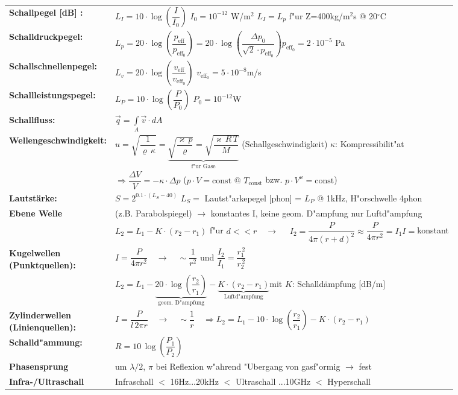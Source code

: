 \begin{tabular}{>{\bfseries}ll}
Schallpegel [dB] : & $\boxed{L_I=10\cdot \log\left(\dfrac{I}{I_0}\right)}$\qquad
$I_0=10^{-12}$ W/m$^2$ \qquad $L_I=L_p$ f"ur Z=400kg/m$^2$s @ 20$^{\circ}$C\\
Schalldruckpegel: & $L_p=20\cdot\log\left(\dfrac{p_{\text{eff}}}{p_{\text{eff}_0}}\right)= 20\cdot\log\left(\dfrac{\Delta p_0}{\sqrt{2}\cdot p_{\text{eff}_0}}\right)$\qquad $p_{\text{eff}_0}=2\cdot 10^{-5}$ Pa\\
Schallschnellenpegel: & $L_v=20\cdot\log\left(\dfrac{v_{\text{eff}}}{v_{\text{eff}_0}}\right)$ \qquad $v_{\text{eff}_0}=5\cdot10^{-8}$m/s \\
Schallleistungspegel: & 
$L_P = 10\cdot\log\left(\dfrac{P}{P_0}\right)$ \qquad  $P_0=10^{-12}$W\\
Schallfluss: & $\vec q=\int\limits_{A}{\vec v\cdot dA}$\\
Wellengeschwindigkeit: & $u=\sqrt{\dfrac{1}{\varrho\,\kappa}}=\underbrace{\sqrt{\dfrac{\varkappa\,p}{\varrho}}=\sqrt{\dfrac{\varkappa\,R\,T}{M}}}_{\text{f"ur Gase}}$ \qquad (Schallgeschwindigkeit) $\kappa$: Kompressibilit"at \quad\\
& $\Rightarrow\dfrac{\Delta V}{V}=-\kappa\cdot\Delta p$ \qquad ($p\cdot V=\text{const}\,\,@\,\,T_{\text{const}}$ bzw. $p\cdot V^{\varkappa}=\text{const}$) \\
Lautstärke: & $S=2^{0.1\cdot(L_S-40)}$ \qquad $L_S=$ Lautst"arkepegel [phon] = $L_P$ @ 1kHz, H"orschwelle 4phon\\
Ebene Welle & (z.B. Parabolspiegel) $\rightarrow$ konstantes I, keine geom. D"ampfung nur Luftd"ampfung\\
& $\boxed{L_2=L_1-K\cdot(r_2-r_1)}$ f"ur $d<<r\quad\rightarrow\quad$ $I_2=\dfrac{P}{4\pi(r+d)^2}\approx\dfrac{P}{4\pi r^2}=I_1$\quad$I=$konstant\\
\parbox{3cm}{Kugelwellen\\
(Punktquellen)}: &  $I=\dfrac{P}{4\pi r^2}\quad\rightarrow\quad \sim\dfrac{1}{r^2}$ und $\dfrac{I_2}{I_1}=\dfrac{r_1^{\,2}}{r_2^{\,2}}$  \\
&$\boxed
{L_2=L_1-\underbrace{20\cdot\log\left(\dfrac{r_2}{r_1}\right)}_{\text{geom. D"ampfung}}-\underbrace{K\cdot(r_2-r_1)}_{\text{Luftd"ampfung}}}$\quad mit $K$: Schalldämpfung [dB/m]\\
\parbox{3cm}{Zylinderwellen\\
(Linienquellen)}: &$I=\dfrac{P}{l\,2\pi r}\quad\rightarrow\quad \sim\dfrac{1}{r} \quad \Rightarrow \boxed{L_2=L_1-10\cdot\log\left(\dfrac{r_2}{r_1}\right)-K\cdot(r_2-r_1)}$ \\
Schalld"ammung: & $\boxed{R=10\,\log\left(\dfrac{P_1}{P_2}\right)}$ \\
Phasensprung & um $\lambda/2$, $\pi$ bei Reflexion w"ahrend "Ubergang von gasf"ormig $\rightarrow$ fest  \\
Infra-/Ultraschall & Infraschall $<$ 16Hz...20kHz $<$ Ultraschall ...10GHz $<$ Hyperschall\\
\end{tabular}
\renewcommand{\arraystretch}{\arraystretchOriginal}

